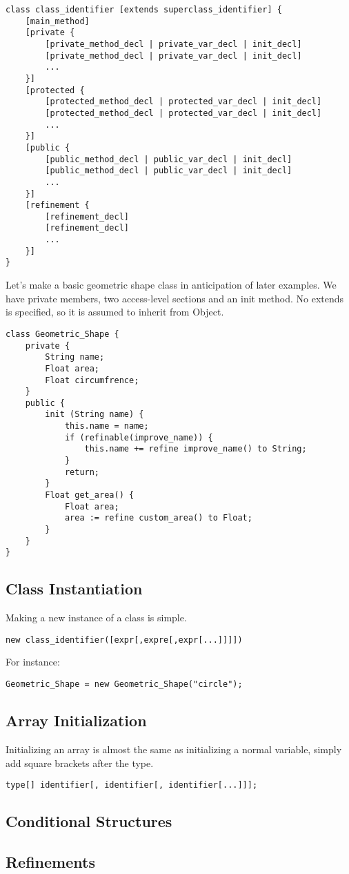 \begin{lstlisting}
class class_identifier [extends superclass_identifier] {
    [main_method]
    [private {
        [private_method_decl | private_var_decl | init_decl]
        [private_method_decl | private_var_decl | init_decl]
        ...
    }]
    [protected {
        [protected_method_decl | protected_var_decl | init_decl]
        [protected_method_decl | protected_var_decl | init_decl]
        ...
    }]
    [public {
        [public_method_decl | public_var_decl | init_decl]
        [public_method_decl | public_var_decl | init_decl]
        ...
    }]
    [refinement {
        [refinement_decl]
        [refinement_decl]
        ...
    }]
}
\end{lstlisting}

Let's make a basic geometric shape class in anticipation of later examples. We have private members, two access-level sections and an init method. No extends is specified, so it is assumed to inherit from Object.


\begin{lstlisting}[label=Method Invocation,caption=Class Declaration for a Geometric Shape class]
class Geometric_Shape {
    private {
        String name;
        Float area;
        Float circumfrence;
    }
    public {
        init (String name) {
            this.name = name;
            if (refinable(improve_name)) {
                this.name += refine improve_name() to String;
            }
            return;
        }
        Float get_area() {
            Float area;
            area := refine custom_area() to Float;
        }
    }
}
\end{lstlisting}

\subsection{Class Instantiation}
Making a new instance of a class is simple.

\begin{lstlisting}
new class_identifier([expr[,expre[,expr[...]]]])
\end{lstlisting}

For instance:

\begin{lstlisting}[label=Method Invocation,caption=Class Instantiation for a Geometric Shape class]
Geometric_Shape = new Geometric_Shape("circle");
\end{lstlisting}

\subsection{Array Initialization}
Initializing an array is almost the same as initializing a normal variable, simply add square brackets after the type.

\begin{lstlisting}
type[] identifier[, identifier[, identifier[...]]];
\end{lstlisting}

\subsection{Conditional Structures}

\subsection{Refinements}